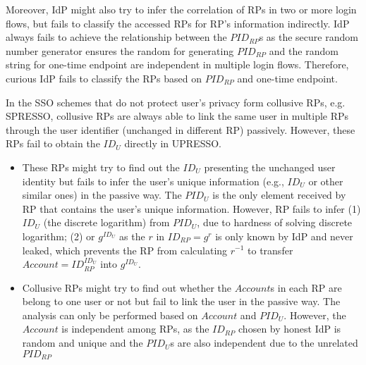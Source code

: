 Moreover, IdP might also try to infer the correlation of RPs in two or more login flows, but fails to classify the accessed RPs for RP's information indirectly. IdP always fails to achieve the relationship between the $PID_{RP}$s as the secure random number generator ensures the random for generating $PID_{RP}$ and the random string for one-time endpoint are independent in multiple login flows. Therefore, curious IdP fails to classify the RPs based on $PID_{RP}$ and one-time endpoint.

In the SSO schemes that do not protect user's privacy form collusive RPs, e.g. SPRESSO, collusive RPs are always able to link the same user in multiple RPs through the user identifier (unchanged in different RP) passively. However, these RPs fail to obtain the $ID_U$ directly in UPRESSO.
\begin{itemize}
\item These RPs might try to find out the $ID_U$ presenting the unchanged user identity but fails to infer the user's unique information (e.g., $ID_U$ or other similar ones) in the passive way. The $PID_U$ is the only element received by RP that contains the user's unique information. However, RP fails to infer (1) $ID_U$ (the discrete logarithm) from $PID_U$, due to hardness of solving discrete logarithm; (2) or $g^{ID_U}$ as the $r$ in $ID_{RP}=g^r$ is only known by IdP and never leaked, which prevents the RP from calculating $r^{-1}$ to transfer $Account=ID_{RP}^{ID_U}$ into  $g^{ID_U}$.
\item Collusive RPs might try to find out whether the $Account$s in each RP are belong to one user or not but fail to link the user in the passive way. The analysis can only be performed based on $Account$ and $PID_U$. However, the $Account$ is independent among RPs, as the $ID_{RP}$ chosen by honest IdP is random and unique and the $PID_U$s are  also independent due to the unrelated $PID_{RP}$
\end{itemize}

